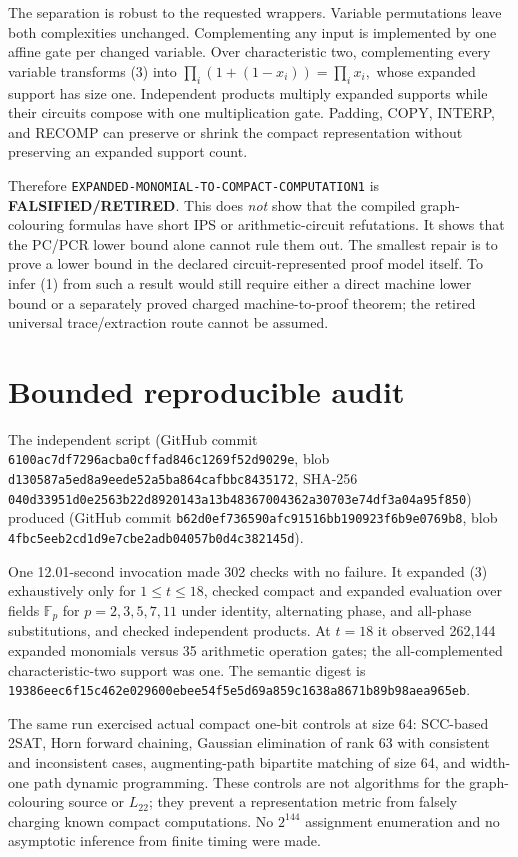 \documentclass[11pt]{article}
\newcommand{\RET}{\textbf{FALSIFIED/RETIRED}}
\begin{document}
The separation is robust to the requested wrappers.  Variable permutations
leave both complexities unchanged.  Complementing any input is implemented
by one affine gate per changed variable.  Over characteristic two,
complementing every variable transforms (3) into
\(
  \prod_i(1+(1-x_i))=\prod_i x_i,
\)
whose expanded support has size one.  Independent products multiply expanded
supports while their circuits compose with one multiplication gate.  Padding,
COPY, INTERP, and RECOMP can preserve or shrink the compact representation
without preserving an expanded support count.

Therefore \texttt{EXPANDED-MONOMIAL-TO-COMPACT-COMPUTATION1} is
\RET.  This does \emph{not} show that the compiled graph-colouring formulas
have short IPS or arithmetic-circuit refutations.  It shows that the PC/PCR
lower bound alone cannot rule them out.  The smallest repair is to prove a
lower bound in the declared circuit-represented proof model itself.  To infer
(1) from such a result would still require either a direct machine lower bound
or a separately proved charged machine-to-proof theorem; the retired universal
trace/extraction route cannot be assumed.

\section{Bounded reproducible audit}
The independent script
(GitHub commit \texttt{6100ac7df7296acba0cffad846c1269f52d9029e}, blob
\texttt{d130587a5ed8a9eede52a5ba864cafbbc8435172}, SHA-256
\texttt{040d33951d0e2563b22d8920143a13b48367004362a30703e74df3a04a95f850})
produced
(GitHub commit \texttt{b62d0ef736590afc91516bb190923f6b9e0769b8}, blob
\texttt{4fbc5eeb2cd1d9e7cbe2adb04057b0d4c382145d}).

One 12.01-second invocation made 302 checks with no failure.  It expanded
(3) exhaustively only for $1\le t\le18$, checked compact and expanded
evaluation over fields $\mathbb F_p$ for $p=2,3,5,7,11$ under identity,
alternating phase, and all-phase substitutions, and checked independent
products.  At $t=18$ it observed 262,144 expanded monomials versus 35
arithmetic operation gates; the all-complemented characteristic-two support
was one.  The semantic digest is
\texttt{19386eec6f15c462e029600ebee54f5e5d69a859c1638a8671b89b98aea965eb}.

The same run exercised actual compact one-bit controls at size 64: SCC-based
2SAT, Horn forward chaining, Gaussian elimination of rank 63 with consistent
and inconsistent cases, augmenting-path bipartite matching of size 64, and
width-one path dynamic programming.  These controls are not algorithms for
the graph-colouring source or $L_{22}$; they prevent a representation metric
from falsely charging known compact computations.  No $2^{144}$ assignment
enumeration and no asymptotic inference from finite timing were made.
\end{document}
